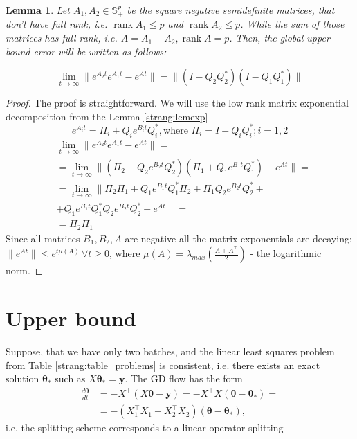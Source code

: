 \documentclass{article}
\newtheorem{lemma}{Lemma}
\newcommand{\vect}[1]{\boldsymbol{\mathbf{#1}}}
\begin{document}
\begin{lemma}
    \label{strang:lemupper_2}
    Let $A_1, A_2 \in \mathbb{S}^p_{+}$ be the square negative semidefinite matrices, that don't have full rank, i.e. $\operatorname{rank}{A_1} \leq p$ and $\operatorname{rank}{A_2} \leq p$. While the sum of those matrices has full rank, i.e. $A = A_1 + A_2, \operatorname{rank}{A} = p$. Then, the global upper bound error will be written as follows:

    \begin{equation}\label{strang:lemupper}
        \lim_{t \to \infty}\| e^{A_2t}e^{A_1t} - e^{At}\| = \|(I - Q_2Q_2^*)(I - Q_1Q_1^*)\|
    \end{equation}
\end{lemma}
\begin{proof}
    The proof is straightforward. We will use the low rank matrix exponential decomposition from the Lemma \ref{strang:lemexp}
    $$
    e^{A_it} = \Pi_i + Q_i e^{B_it} Q_i^*, \text{where } \Pi_i = I - Q_iQ_i^*; i = 1,2
    $$
    \begin{align*}
    &\lim_{t \to \infty}\| e^{A_2t}e^{A_1t} - e^{At}\| = \\ 
    &= \lim_{t \to \infty}\| (\Pi_2 + Q_2 e^{B_2t} Q_2^*)(\Pi_1 + Q_1 e^{B_1t} Q_1^*) - e^{At}\| = \\
    &= \lim_{t \to \infty}\| \Pi_2\Pi_1 + Q_1 e^{B_1t} Q_1^*\Pi_2 + \Pi_1Q_2 e^{B_2t} Q_2^* + \\
    &+  Q_1 e^{B_1t} Q_1^* Q_2 e^{B_2t} Q_2^* - e^{At}\| =\\&= \Pi_2 \Pi_1
    \end{align*}
    Since all matrices $B_1, B_2, A$ are negative all the matrix exponentials are decaying: $\|e^{At}\|\leq e^{t\mu (A)}\, \forall t\geq 0$, where $\mu(A) = \lambda_{max} \left( \frac{A + A^\top}{2}\right)$ - the logarithmic norm.
\end{proof}


\section{Upper bound}

Suppose, that we have only two batches, and the linear least squares problem from Table \ref{strang:table_problems} is consistent, i.e. there exists an exact solution $\vect{\theta}_*$ such as $X \vect{\theta}_* = \vect{y}$. The GD flow has the form
\begin{equation}\label{strang:model1}
\begin{split}
    \frac{d \vect{\theta}}{d t} &= -X^{\top} (X \vect{\theta} - \vect{y}) = -X^{\top} X(\vect{\theta} - \vect{\theta}_*) =\\ &= -(X_1^{\top} X_1 + X^{\top}_2 X_2)(\vect{\theta} - \vect{\theta}_*),
\end{split}
\end{equation}
i.e. the splitting scheme corresponds to a linear operator splitting
\end{document}
